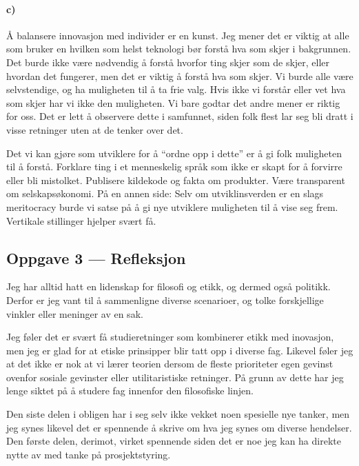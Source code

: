 \documentclass{../../myassignment}
\begin{document}
	\paragraph*{c)}
	\begin{answer}
		Å balansere innovasjon med individer er en kunst. Jeg mener det er viktig at alle som bruker en hvilken som helst teknologi bør forstå hva som skjer i bakgrunnen. Det burde ikke være nødvendig å forstå hvorfor ting skjer som de skjer, eller hvordan det fungerer, men det er viktig å forstå hva som skjer. Vi burde alle være selvstendige, og ha muligheten til å ta frie valg. Hvis ikke vi forstår eller vet hva som skjer har vi ikke den muligheten. Vi bare godtar det andre mener er riktig for oss. Det er lett å observere dette i samfunnet, siden folk flest lar seg bli dratt i visse retninger uten at de tenker over det. 

		Det vi kan gjøre som utviklere for å ``ordne opp i dette'' er å gi folk muligheten til å forstå. Forklare ting i et menneskelig språk som ikke er skapt for å forvirre eller bli mistolket. Publisere kildekode og fakta om produkter. Være transparent om selskapsøkonomi. På en annen side: Selv om utviklinsverden er en slags meritocracy burde vi satse på å gi nye utviklere muligheten til å vise seg frem. Vertikale stillinger hjelper svært få. 

	\end{answer}

	\pagebreak

	\subsection*{Oppgave 3 --- Refleksjon}
	\begin{answer}
		Jeg har alltid hatt en lidenskap for filosofi og etikk, og dermed også politikk. Derfor er jeg vant til å sammenligne diverse scenarioer, og tolke forskjellige vinkler eller meninger av en sak.

		Jeg føler det er svært få studieretninger som kombinerer etikk med inovasjon, men jeg er glad for at etiske prinsipper blir tatt opp i diverse fag. Likevel føler jeg at det ikke er nok at vi lærer teorien dersom de fleste prioriteter egen gevinst ovenfor sosiale gevinster eller utilitaristiske retninger. På grunn av dette har jeg lenge siktet på å studere fag innenfor den filosofiske linjen. 

		Den siste delen i obligen har i seg selv ikke vekket noen spesielle nye tanker, men jeg synes likevel det er spennende å skrive om hva jeg synes om diverse hendelser. Den første delen, derimot, virket spennende siden det er noe jeg kan ha direkte nytte av med tanke på prosjektstyring.

	\end{answer}
\end{document}
